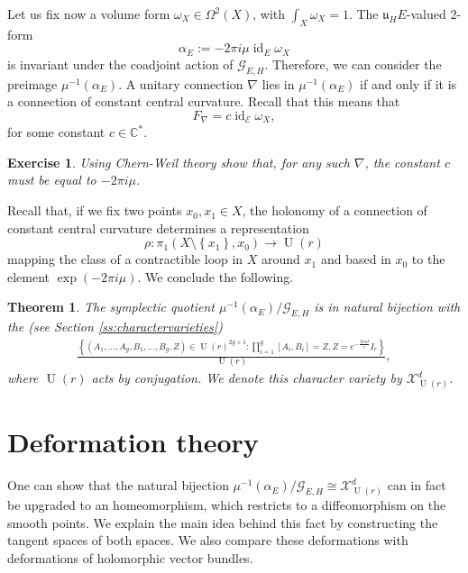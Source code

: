 \documentclass[12pt,a4paper]{amsbook}
\newtheorem{thm}{Theorem}[chapter]
\theoremstyle{remark} \newtheorem{rmk}[thm]{Remark}
\theoremstyle{definition} \newtheorem{defn}[thm]{Definition}
\theoremstyle{definition} \newtheorem{ex}[thm]{Example}
\theoremstyle{definition} \newtheorem{ej}{Exercise}
\let\emph\relax
\newcommand{\C}{\mathbb C}
\newcommand{\cE}{\mathcal E}
\newcommand{\cG}{\mathcal G}
\newcommand{\fu}{\mathfrak u}
\DeclareMathOperator{\U}{U}
\DeclareMathOperator{\id}{id}
\begin{document}
Let us fix now a volume form $\omega_X \in\Omega^2(X)$, with $\int_X \omega_X = 1$. The $\fu_H E$-valued $2$-form
\begin{equation*}
\alpha_E := -2\pi i \mu \id_E \omega_X
\end{equation*}
is invariant under the coadjoint action of $\cG_{E,H}$. Therefore, we can consider the preimage $\mu^{-1}(\alpha_E)$. A unitary connection $\nabla$ lies in $\mu^{-1}(\alpha_E)$ if and only if it is a connection of constant central curvature. Recall that this means that
\begin{equation*}
F_\nabla = c \id_{\cE} \omega_X,
\end{equation*}
for some constant $c\in \C^*$.

\begin{ej}
\textit{Using Chern-Weil theory show that, for any such $\nabla$, the constant $c$ must be equal to $-2\pi i \mu$.}
\end{ej}

Recall that, if we fix two points $x_0,x_1 \in X$, the holonomy of a connection of constant central curvature determines a representation
\begin{equation*}
\rho: \pi_1(X\setminus \left\{ x_1 \right\},x_0) \longrightarrow \U(r)
\end{equation*}
mapping the class of a contractible loop in $X$ around $x_1$ and based in $x_0$ to the element $\exp(-2\pi i \mu)$. We conclude the following.

\begin{thm}
The symplectic quotient $\mu^{-1}(\alpha_E)/\cG_{E,H}$ is in natural bijection with the \emph{$d$-twisted $\U(r)$-character variety} (see Section \ref{ss:charactervarieties})
\begin{align*}
  \frac{\left\{(A_1,\dots,A_g, B_1,\dots, B_g, Z) \in \U(r)^{2g+1}: \prod_{i=1}^g [A_i,B_i]=Z, Z=e^{-\tfrac{2\pi id}{r}}I_r \right\}}{\U(r)},
\end{align*}
where $\U(r)$ acts by conjugation. We denote this character variety by $\mathcal{X}^d_{\U(r)}$.
\end{thm}

\section{Deformation theory} \label{ss:deformation}
One can show that the natural bijection $\mu^{-1}(\alpha_E)/\cG_{E,H} \cong \mathcal{X}^d_{\U(r)}$ can in fact be upgraded to an homeomorphism, which restricts to a diffeomorphism on the smooth points. We explain the main idea behind this fact by constructing the tangent spaces of both spaces. We also compare these deformations with deformations of holomorphic vector bundles.
\end{document}
